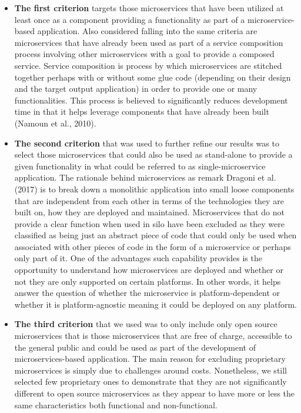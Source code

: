 \documentclass{article}
\begin{document}
\begin{itemize} 

\item \textbf{The first criterion} targets those microservices that have been utilized at least once as a component providing a functionality as part of a microservice-based application. Also considered falling into the same criteria are microservices that have already been used as part of a service composition process involving other microservices with a goal to provide a composed service. Service composition is process by which microservices are stitched together perhaps with or without some glue code (depending on their design and the target output application) in order to provide one or many functionalities. This process is believed to significantly reduces development time in that it helps leverage components that have already been built (Namoun et al., 2010).


\item \textbf{The second criterion} that was used to further refine our results was to select those microservices that could also be used as stand-alone to provide a given functionality in what could be referred to as single-microservice application. The rationale behind microservices as remark Dragoni et al. (2017) is to break down a monolithic application into small loose components that are independent from each other in terms of the technologies they are built on, how they are deployed and maintained. Microservices that do not provide a clear function when used in silo have been excluded as they were classified as being just an abstract piece of code that could only be used when associated with other pieces of code in the form of a microservice or perhaps only part of it. One of the advantages such capability provides is the opportunity to understand how microservices are deployed and whether or not they are only supported on certain platforms. In other words, it helps answer the question of whether the microservice is platform-dependent or whether it is platform-agnostic meaning it could be deployed on any platform.

\item \textbf{The third criterion} that we used was to only include only open source microservices that is those microservices that are free of charge, accessible to the general public and could be used as part of the development of microservices-based application. The main reason for excluding proprietary microservices is simply due to challenges around costs. Nonetheless, we still selected few proprietary ones to demonstrate that they are not significantly different to open source microservices as they appear to have more or less the same characteristics both functional and non-functional.


\end{itemize}
\end{document}
